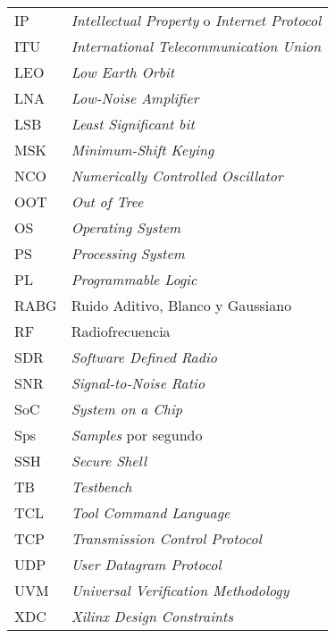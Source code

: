 \documentclass[screen, pagebackref,oneside]{ibtesis}
\begin{document}
\begin{preliminary}
\begin{abreviaturas}
\begin{longtable}{ll}
            IP &    \textit{Intellectual Property} o \textit{Internet Protocol} \\
            ITU &   \textit{International Telecommunication Union} \\
            LEO &   \textit{Low Earth Orbit}        \\
            LNA &   \textit{Low-Noise Amplifier}    \\
            LSB &   \textit{Least Significant bit}  \\
            MSK &   \textit{Minimum-Shift Keying}  \\
            NCO &   \textit{Numerically Controlled Oscillator}  \\
            OOT &   \textit{Out of Tree}    \\
            OS  &   \textit{Operating System}   \\
            PS  &   \textit{Processing System}  \\
            PL  &   \textit{Programmable Logic} \\
            RABG &  Ruido Aditivo, Blanco y Gaussiano   \\
            RF  &   Radiofrecuencia                 \\
            SDR &   \textit{Software Defined Radio} \\
            SNR &   \textit{Signal-to-Noise Ratio}  \\
            SoC &   \textit{System on a Chip}       \\
            Sps &   \textit{Samples} por segundo   \\
            SSH &   \textit{Secure Shell}   \\
            TB  &   \textit{Testbench}  \\
            TCL &   \textit{Tool Command Language}  \\
            TCP &   \textit{Transmission Control Protocol}  \\
            UDP &   \textit{User Datagram Protocol} \\
            UVM &   \textit{Universal Verification Methodology} \\
            XDC &   \textit{Xilinx Design Constraints}
        \end{longtable}
    \end{abreviaturas}
    
    \tableofcontents                %
    \listoffigures                  %
    \listoftables                   %
    
    
\end{preliminary}
\end{document}
